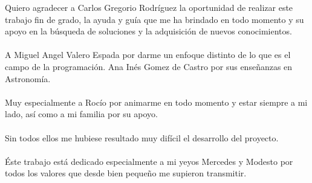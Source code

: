 	Quiero agradecer a Carlos Gregorio Rodríguez la oportunidad de realizar este trabajo fin de grado, la ayuda y guía que me ha brindado en todo momento y su apoyo en la búsqueda de soluciones y la adquisición de nuevos conocimientos.\\ 
	\\ A Miguel Angel Valero Espada por darme un enfoque distinto de lo que es el campo de la programación. Ana Inés Gomez de Castro por sus enseñanzas en Astronomía.\\
	\\ Muy especialmente a Rocío por animarme en todo momento y estar siempre a mi lado, así como a mi familia por su apoyo.\\
	\\ Sin todos ellos me hubiese resultado muy difícil el desarrollo del proyecto.
	\\
	\\Éste trabajo está dedicado especialmente a mi yeyos Mercedes y Modesto por todos los valores que desde bien pequeño me supieron transmitir.
	\newpage

